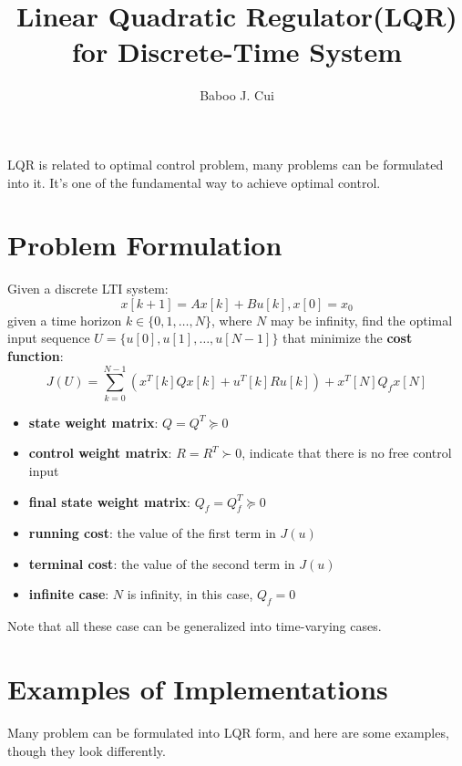 \documentclass[10pt,a4paper,oneside]{article}
\author{Baboo J. Cui}
\title{Linear Quadratic Regulator(LQR) for Discrete-Time System}
\begin{document}
\maketitle
\tableofcontents

\newpage

LQR is related to optimal control problem, many problems can be formulated into it. It's one of the fundamental way to achieve optimal control.

\section{Problem Formulation}
Given a discrete LTI system:
\[
x[k+1] = Ax[k] + Bu[k], x[0] = x_0
\]
given a time horizon $k \in \{0, 1, \dots, N\}$, where $N$ may be infinity, find the optimal input sequence $U = \{u[0], u[1], \dots, u[N-1]\}$ that minimize the \textbf{cost function}:
\[
J(U) = \sum_{k=0}^{N-1}\left(x^T[k] Qx[k] +u^T[k] Ru[k]\right) + x^T[N]Q_f x[N]
\]

\begin{itemize}
	\item \textbf{state weight matrix}: $Q = Q^T \succeq 0$
	\item \textbf{control weight matrix}: $R = R^T \succ 0$, indicate that there is no free control input
	\item \textbf{final state weight matrix}: $Q_f = Q_f^T \succeq 0$
	\item \textbf{running cost}: the value of the first term in $J(u)$
	\item \textbf{terminal cost}: the value of the second term in $J(u)$
	\item \textbf{infinite case}: $N$ is infinity, in this case, $Q_f = 0$
\end{itemize}
Note that all these case can be generalized into time-varying cases.

\section{Examples of Implementations}
Many problem can be formulated into LQR form, and here are some examples, though they look differently.
\end{document}
